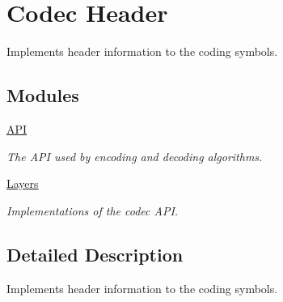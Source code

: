 \hypertarget{group__codec__header}{\section{Codec Header}
\label{group__codec__header}
}


Implements header information to the coding symbols.  


\subsection*{Modules}
\begin{DoxyCompactItemize}
\item 
\hyperlink{group__codec__header__api}{A\-P\-I}
\begin{DoxyCompactList}\small\item\em The A\-P\-I used by encoding and decoding algorithms. \end{DoxyCompactList}\item 
\hyperlink{group__codec__header__layers}{Layers}
\begin{DoxyCompactList}\small\item\em Implementations of the codec A\-P\-I. \end{DoxyCompactList}\end{DoxyCompactItemize}


\subsection{Detailed Description}
Implements header information to the coding symbols. 